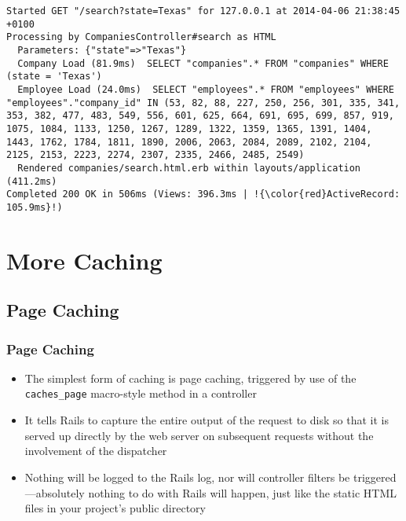 \documentclass{beamer}
\begin{document}
\begin{frame}
\begin{itemize}
\lstset{language=shell}
\begin{lstlisting}[escapechar=!]
Started GET "/search?state=Texas" for 127.0.0.1 at 2014-04-06 21:38:45 +0100
Processing by CompaniesController#search as HTML
  Parameters: {"state"=>"Texas"}
  Company Load (81.9ms)  SELECT "companies".* FROM "companies" WHERE (state = 'Texas')
  Employee Load (24.0ms)  SELECT "employees".* FROM "employees" WHERE "employees"."company_id" IN (53, 82, 88, 227, 250, 256, 301, 335, 341, 353, 382, 477, 483, 549, 556, 601, 625, 664, 691, 695, 699, 857, 919, 1075, 1084, 1133, 1250, 1267, 1289, 1322, 1359, 1365, 1391, 1404, 1443, 1762, 1784, 1811, 1890, 2006, 2063, 2084, 2089, 2102, 2104, 2125, 2153, 2223, 2274, 2307, 2335, 2466, 2485, 2549)
  Rendered companies/search.html.erb within layouts/application (411.2ms)
Completed 200 OK in 506ms (Views: 396.3ms | !{\color{red}ActiveRecord: 105.9ms}!)
\end{lstlisting}

\end{itemize}
\end{frame}


\section{More Caching}
\subsection{Page Caching}
\begin{frame}[fragile]
\frametitle{Page Caching}
\begin{itemize}
\item The simplest form of caching is page caching, triggered by use of the \texttt{caches\_page}
macro-style method in a controller
\item It tells Rails to capture the entire output of the
request to disk so that it is served up directly by the web server on subsequent requests
without the involvement of the dispatcher
\item Nothing will be logged to the Rails log, nor
will controller filters be triggered—absolutely nothing to do with Rails will happen, just
like the static HTML files in your project’s public directory
\end{itemize}
\end{frame}
\end{document}
